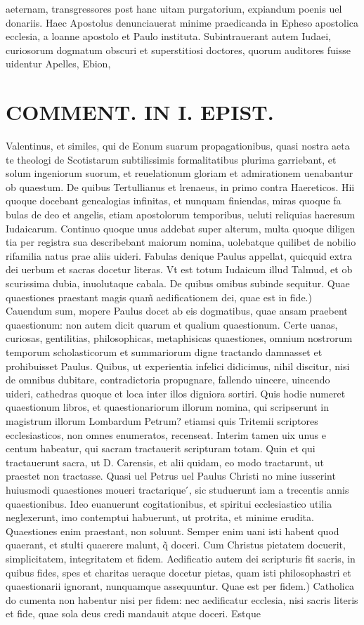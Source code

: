 \documentclass{article}
\begin{document}
\begin{pages}
aeternam, transgressores post hanc uitam purgatorium, expiandum poenis uel donariis. Haec Apostolus denunciauerat minime praedicanda in Epheso apostolica ecclesia, a loanne apostolo et Paulo instituta. Subintrauerant autem Iudaei, curiosorum dogmatum obscuri et superstitiosi doctores, quorum auditores fuisse uidentur Apelles, Ebion,  \pend
\section*{COMMENT. IN I. EPIST. }
\marginpar{[ p.468 ]}\pstart Valentinus, et similes, qui de Eonum suarum propagationibus, quasi nostra aeta te theologi de Scotistarum subtilissimis formalitatibus plurima garriebant, et solum ingeniorum suorum, et reuelationum gloriam et admirationem uenabantur ob quaestum. De quibus Tertullianus et lrenaeus, in primo contra Haereticos. Hii quoque docebant genealogias infinitas, et nunquam finiendas, miras quoque fa bulas de deo et angelis, etiam apostolorum temporibus, ueluti reliquias haeresum Iudaicarum. Continuo quoque unus addebat super alterum, multa quoque diligen tia per registra sua describebant maiorum nomina, uolebatque quilibet de nobilio rifamilia natus prae aliis uideri. Fabulas denique Paulus appellat, quicquid extra dei uerbum et sacras docetur literas. Vt est totum Iudaicum illud Talmud, et ob scurissima dubia, inuolutaque cabala. De quibus omibus subinde sequitur. Quae quaestiones praestant magis quam̃ aedificationem dei, quae est in fide.) Cauendum sum, mopere Paulus docet ab eis dogmatibus, quae ansam praebent quaestionum: non autem dicit quarum et qualium quaestionum. Certe uanas, curiosas, gentilitias, philosophicas, metaphisicas quaestiones, omnium nostrorum temporum scholasticorum et summariorum digne tractando damnasset et prohibuisset Paulus. Quibus, ut experientia infelici didicimus, nihil discitur, nisi de omnibus dubitare, contradictoria propugnare, fallendo uincere, uincendo uideri, cathedras quoque  et loca inter illos digniora sortiri. Quis hodie numeret quaestionum libros, et quaestionariorum illorum nomina, qui scripserunt in magistrum illorum Lombardum Petrum? etiamsi quis Tritemii scriptores ecclesiasticos, non omnes enumeratos, recenseat. Interim tamen uix unus e centum habeatur, qui sacram tractauerit scripturam totam. Quin et qui tractauerunt sacra, ut D. Carensis, et alii quidam, eo modo tractarunt, ut praestet non tractasse. Quasi uel Petrus uel Paulus Christi no mine iusserint huiusmodi quaestiones moueri tractarique ́, sic studuerunt iam a trecentis annis quaestionibus. Ideo euanuerunt cogitationibus, et spiritui ecclesiastico utilia neglexerunt, imo contemptui habuerunt, ut protrita, et minime erudita. Quaestiones enim praestant, non soluunt. Semper enim uani isti habent quod quaerant, et stulti quaerere malunt, q̃ doceri. Cum Christus pietatem docuerit, simplicitatem, integritatem et fidem. Aedificatio autem dei scripturis fit sacris, in quibus fides, spes et charitas ueraque docetur pietas, quam isti philosophastri et quaestionarii ignorant, nunquamque assequuntur. Quae est per fidem.) Catholica do cumenta non habentur nisi per fidem: nec aedificatur ecclesia, nisi sacris literis et fide, quae sola deus credi mandauit atque doceri. Estque 
\end{pages}
\end{document}
